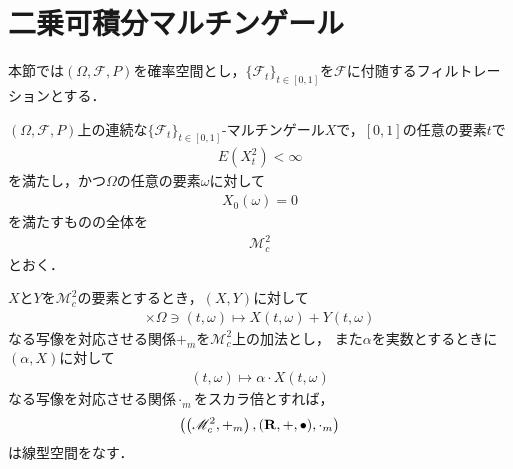 \section{二乗可積分マルチンゲール}
	本節では$(\Omega,\mathscr{F},P)$を確率空間とし，$\{\mathscr{F}_t\}_{t \in [0,1]}$を$\mathscr{F}$に付随するフィルトレーションとする．
	
	\begin{screen}
		\begin{dfn}[二乗可積分マルチンゲール]
			$(\Omega,\mathscr{F},P)$上の連続な$\{\mathscr{F}_t\}_{t \in [0,1]}$-マルチンゲール$X$で，$[0,1]$の任意の要素$t$で
			\begin{align}
				E\left(X_{t}^{2}\right) < \infty
			\end{align}
			を満たし，かつ$\Omega$の任意の要素$\omega$に対して
			\begin{align}
				X_0(\omega) = 0
			\end{align}
			を満たすものの全体を
			\begin{align}
				\mathscr{M}_{c}^{2}
			\end{align}
			とおく．
		\end{dfn}
	\end{screen}
	
	\begin{screen}
		\begin{thm}
			$X$と$Y$を$\mathscr{M}_{c}^{2}$の要素とするとき，$(X,Y)$に対して
			\begin{align}
				[0,1] \times \Omega \ni (t,\omega) \longmapsto X(t,\omega) + Y(t,\omega)
			\end{align}
			なる写像を対応させる関係$+_{m}$を$\mathscr{M}_{c}^{2}$上の加法とし，
			また$\alpha$を実数とするときに$(\alpha,X)$に対して
			\begin{align}
				(t,\omega) \longmapsto \alpha \cdot X(t,\omega)
			\end{align}
			なる写像を対応させる関係$\cdot_{m}$をスカラ倍とすれば，
			\begin{align}
				\left(\left(\mathscr{M}_{c}^{2},+_{m} \right),(\mathbf{R},+,\bullet),\cdot_{m}\right)
			\end{align}
			は線型空間をなす．
		\end{thm}
	\end{screen}
	
	\begin{screen}
		\begin{thm}[Doobの劣マルチンゲール不等式]
		\end{thm}
	\end{screen}
	
